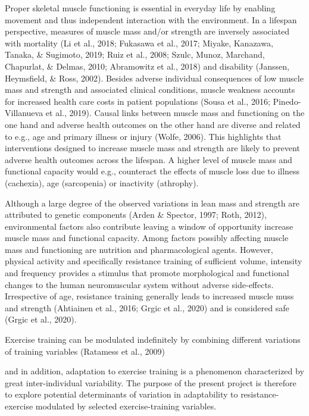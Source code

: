 \documentclass[twoside,10pt]{gihclass} %
\begin{document}
Proper skeletal muscle functioning is essential in everyday life by enabling movement and thus independent interaction with the environment. In a lifespan perspective, measures of muscle mass and/or strength are inversely associated with mortality
(Li et al., 2018; Fukasawa et al., 2017; Miyake, Kanazawa, Tanaka, \& Sugimoto, 2019; Ruiz et al., 2008; Szulc, Munoz, Marchand, Chapurlat, \& Delmas, 2010; Abramowitz et al., 2018)
and disability
(Janssen, Heymsfield, \& Ross, 2002).
Besides adverse individual consequences of low muscle mass and strength and associated clinical conditions, muscle weakness accounts for increased health care costs in patient populations
(Sousa et al., 2016; Pinedo-Villanueva et al., 2019).
Causal links between muscle mass and functioning on the one hand and adverse health outcomes on the other hand are diverse and related to e.g., age and primary illness or injury
(Wolfe, 2006).
This highlights that interventions designed to increase muscle mass and strength are likely to prevent adverse health outcomes across the lifespan. A higher level of muscle mass and functional capacity would e.g., counteract the effects of muscle loss due to illness (cachexia), age (sarcopenia) or inactivity (athrophy).

Although a large degree of the observed variations in lean mass and strength are attributed to genetic components
(Arden \& Spector, 1997; Roth, 2012),
environmental factors also contribute leaving a window of opportunity increase muscle mass and functional capacity. Among factors possibly affecting muscle mass and functioning are nutrition and pharmacological agents. However, physical activity and specifically resistance training of sufficient volume, intensity and frequency provides a stimulus that promote morphological and functional changes to the human neuromuscular system without adverse side-effects. Irrespective of age, resistance training generally leads to increased muscle muss and strength
(Ahtiainen et al., 2016; Grgic et al., 2020)
and is considered safe
(Grgic et al., 2020).

Exercise training can be modulated indefinitely by combining different variations of training variables (Ratamess et al., 2009)

and in addition, adaptation to exercise training is a phenomenon characterized by great inter-individual variability. The purpose of the present project is therefore to explore potential determinants of variation in adaptability to resistance-exercise modulated by selected exercise-training variables.
\end{document}
